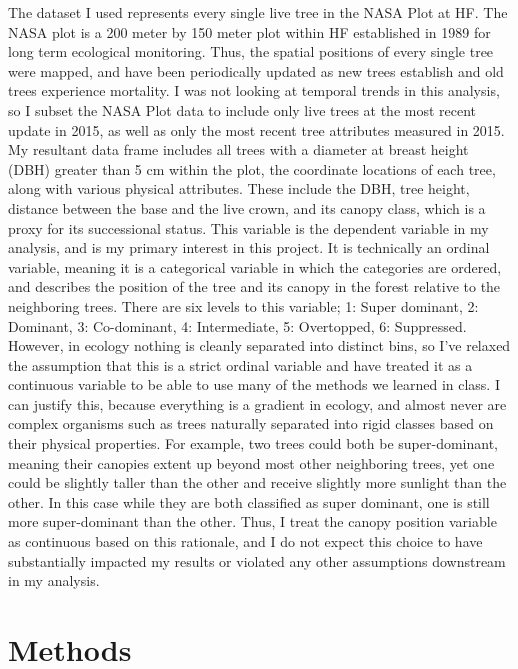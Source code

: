 \documentclass[12pt,a4paper]{article}
\begin{document}
The dataset I used represents every single live tree in the NASA Plot at HF.  The NASA plot is a 200 meter by 150 meter plot within HF established in 1989 for long term ecological monitoring.  Thus, the spatial positions of every single tree were mapped, and have been periodically updated as new trees establish and old trees experience mortality.  I was not looking at temporal trends in this analysis, so I subset the NASA Plot data to include only live trees at the most recent update in 2015, as well as only the most recent tree attributes measured in 2015.  My resultant data frame includes all trees with a diameter at breast height (DBH) greater than 5 cm within the plot, the coordinate locations of each tree, along with various physical attributes.  These include the DBH, tree height, distance between the base and the live crown, and its canopy class, which is a proxy for its successional status.  This variable is the dependent variable in my analysis, and is my primary interest in this project.  It is technically an ordinal variable, meaning it is a categorical variable in which the categories are ordered, and describes the position of the tree and its canopy in the forest relative to the neighboring trees.  There are six levels to this variable;  1: Super dominant, 2: Dominant, 3: Co-dominant, 4: Intermediate, 5: Overtopped, 6: Suppressed.  However, in ecology nothing is cleanly separated into distinct bins, so I've relaxed the assumption that this is a strict ordinal variable and have treated it as a continuous variable to be able to use many of the methods we learned in class.  I can justify this, because everything is a gradient in ecology, and almost never are complex organisms such as trees naturally separated into rigid classes based on their physical properties.  For example, two trees could both be super-dominant, meaning their canopies extent up beyond most other neighboring trees, yet one could be slightly taller than the other and receive slightly more sunlight than the other.  In this case while they are both classified as super dominant, one is still more super-dominant than the other.  Thus, I treat the canopy position variable as continuous based on this rationale, and I do not expect this choice to have substantially impacted my results or violated any other assumptions downstream in my analysis.

\section{Methods}
\end{document}
